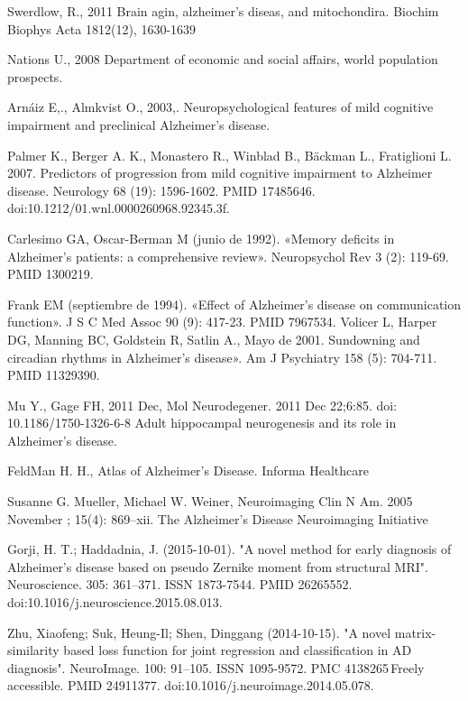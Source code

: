 \begin{thebibliography}{9}
	Swerdlow, R.,
	2011
	Brain agin, alzheimer's diseas, and mitochondira.
	Biochim Biophys Acta 1812(12), 1630-1639


	Nations U.,
	2008
	Department of economic and social affairs, world population prospects. 

	 Arnáiz E,., 
	 Almkvist O., 
	 2003,. 
	 Neuropsychological features of mild cognitive impairment and preclinical Alzheimer's disease. 



 	Palmer K., 
 	Berger A. K., 
 	Monastero R., 
 	Winblad B., 
 	Bäckman L., 
 	Fratiglioni L. 
 	2007. 
 	Predictors of progression from mild cognitive impairment to Alzheimer disease. 
 	Neurology 68 (19): 1596-1602. 
 	PMID 17485646. doi:10.1212/01.wnl.0000260968.92345.3f.

	 Carlesimo GA, Oscar-Berman M (junio de 1992). «Memory deficits in Alzheimer's patients: a comprehensive review». Neuropsychol Rev 3 (2): 119-69. PMID 1300219.

 	 Frank EM (septiembre de 1994). «Effect of Alzheimer's disease on communication function». J S C Med Assoc 90 (9): 417-23. PMID 7967534.
	Volicer L, 
	Harper DG, 
	Manning BC, 
	Goldstein R, 
	Satlin A., 
	Mayo de 2001. 
	Sundowning and circadian rhythms in Alzheimer's disease». Am J Psychiatry 158 (5): 704-711. PMID 11329390. 


	Mu Y., 
	Gage FH,
	2011 Dec,
Mol Neurodegener. 2011 Dec 22;6:85. doi: 10.1186/1750-1326-6-8
Adult hippocampal neurogenesis and its role in Alzheimer's disease.


	FeldMan H. H.,
	Atlas of Alzheimer's Disease.
	Informa Healthcare

	Susanne G. Mueller, 
	Michael W. Weiner, 
	Neuroimaging Clin N Am. 2005 November ; 15(4): 869–xii.
	The Alzheimer’s Disease Neuroimaging Initiative
	
\bibitem{}
 Gorji, H. T.; Haddadnia, J. (2015-10-01). "A novel method for early diagnosis of Alzheimer's disease based on pseudo Zernike moment from structural MRI". Neuroscience. 305: 361–371. ISSN 1873-7544. PMID 26265552. doi:10.1016/j.neuroscience.2015.08.013.

\bibitem{}
 Zhu, Xiaofeng; Suk, Heung-Il; Shen, Dinggang (2014-10-15). "A novel matrix-similarity based loss function for joint regression and classification in AD diagnosis". NeuroImage. 100: 91–105. ISSN 1095-9572. PMC 4138265 Freely accessible. PMID 24911377. doi:10.1016/j.neuroimage.2014.05.078.

 \end{thebibliography}
